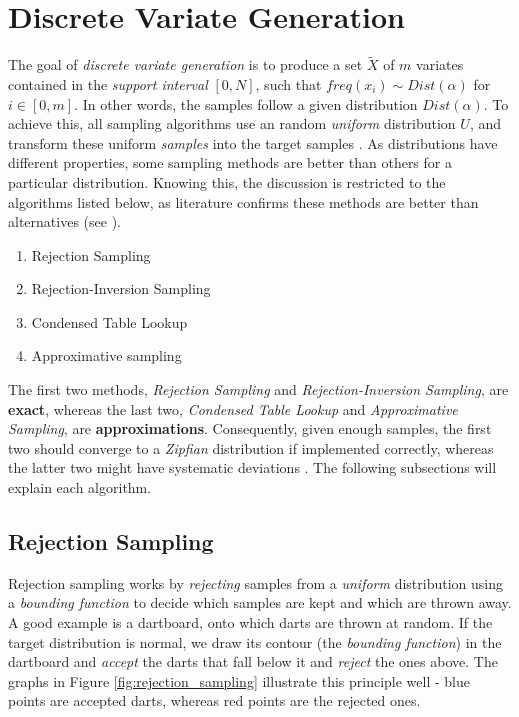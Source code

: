 \section{Discrete Variate Generation}
The goal of \textit{discrete variate generation} is to produce a set
 $\tilde{X}$ of $m$ variates contained in the \textit{support interval} $[0,N]$, 
 such that $freq(x_i) \sim Dist(\alpha)$ for $i \in [0,m]$. In other words,
  the samples follow a given distribution $Dist(\alpha)$. To achieve this, all sampling algorithms use 
an random \textit{uniform} distribution $U$, and transform  these uniform \textit{samples} into the 
target samples \cite{kuhlHistoryRandomVariate2017}. As distributions 
have different properties, some sampling methods are better than others for a particular distribution. Knowing this, the discussion is restricted to the algorithms listed below, as literature
confirms these methods are better than alternatives (see \cite{devroyeDiscreteUnivariateDistributions1986,kronmalAliasMethodGenerating1979,kuhlHistoryRandomVariate2017}).

\begin{enumerate}
    \item Rejection Sampling \cite{devroyeDiscreteUnivariateDistributions1986}
    \item Rejection-Inversion Sampling \cite{hormannRejectioninversionGenerateVariates1996}
    \item Condensed Table Lookup \cite{marsagliaFastGenerationDiscrete2004}
    \item Approximative sampling \cite{grayQuicklyGeneratingBillionrecord1994}
\end{enumerate}

The first two methods, \textit{Rejection Sampling} and \textit{Rejection-Inversion Sampling}, are \textbf{exact}, whereas the last two, \textit{Condensed Table Lookup}
and \textit{Approximative Sampling}, are \textbf{approximations}. Consequently, given enough samples, the first two should converge to a \textit{Zipfian} distribution if implemented correctly,
whereas the latter two might have systematic deviations \cite{leydoldErrorDetectionNonUniforma}. The following subsections will explain each algorithm.

\subsection{Rejection Sampling}\label{subsec:rejection_sampling}
Rejection sampling works by \textit{rejecting} samples from a \textit{uniform}
 distribution using a \textit{bounding function} to decide which samples are kept 
and which are thrown away. A good example is a dartboard, onto which darts are 
thrown at random. If the target distribution is normal, we draw its contour
(the \textit{bounding function}) in the dartboard and \textit{accept}
 the darts that fall below it and \textit{reject} the ones above. 
The graphs in Figure \ref{fig:rejection_sampling} illustrate this principle well 
- blue points are accepted darts, whereas red points are the rejected ones.

